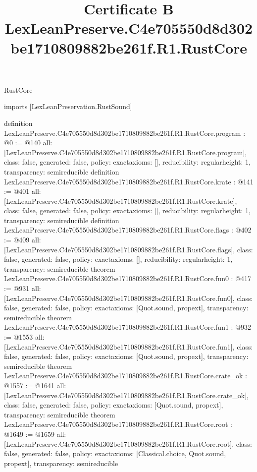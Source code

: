 \begin{lexlean}{RustCore}
\title{Certificate B LexLeanPreserve.C4e705550d8d302be1710809882be261f.R1.RustCore}
\begin{coremodule}
imports [LexLeanPreservation.RustSound]

definition LexLeanPreserve.C4e705550d8d302be1710809882be261f.R1.RustCore.program : @0 := @140 {
  all: [LexLeanPreserve.C4e705550d8d302be1710809882be261f.R1.RustCore.program],
  class: false,
  generated: false,
  policy: exact{axioms: []},
  reducibility: regular{height: 1},
  transparency: semireducible
}
definition LexLeanPreserve.C4e705550d8d302be1710809882be261f.R1.RustCore.krate : @141 := @401 {
  all: [LexLeanPreserve.C4e705550d8d302be1710809882be261f.R1.RustCore.krate],
  class: false,
  generated: false,
  policy: exact{axioms: []},
  reducibility: regular{height: 1},
  transparency: semireducible
}
definition LexLeanPreserve.C4e705550d8d302be1710809882be261f.R1.RustCore.flags : @402 := @409 {
  all: [LexLeanPreserve.C4e705550d8d302be1710809882be261f.R1.RustCore.flags],
  class: false,
  generated: false,
  policy: exact{axioms: []},
  reducibility: regular{height: 1},
  transparency: semireducible
}
theorem LexLeanPreserve.C4e705550d8d302be1710809882be261f.R1.RustCore.fun0 : @417 := @931 {
  all: [LexLeanPreserve.C4e705550d8d302be1710809882be261f.R1.RustCore.fun0],
  class: false,
  generated: false,
  policy: exact{axioms: [Quot.sound, propext]},
  transparency: semireducible
}
theorem LexLeanPreserve.C4e705550d8d302be1710809882be261f.R1.RustCore.fun1 : @932 := @1553 {
  all: [LexLeanPreserve.C4e705550d8d302be1710809882be261f.R1.RustCore.fun1],
  class: false,
  generated: false,
  policy: exact{axioms: [Quot.sound, propext]},
  transparency: semireducible
}
theorem LexLeanPreserve.C4e705550d8d302be1710809882be261f.R1.RustCore.crate_ok : @1557 := @1641 {
  all: [LexLeanPreserve.C4e705550d8d302be1710809882be261f.R1.RustCore.crate_ok],
  class: false,
  generated: false,
  policy: exact{axioms: [Quot.sound, propext]},
  transparency: semireducible
}
theorem LexLeanPreserve.C4e705550d8d302be1710809882be261f.R1.RustCore.root : @1649 := @1659 {
  all: [LexLeanPreserve.C4e705550d8d302be1710809882be261f.R1.RustCore.root],
  class: false,
  generated: false,
  policy: exact{axioms: [Classical.choice, Quot.sound, propext]},
  transparency: semireducible
}


\end{coremodule}
\end{lexlean}
